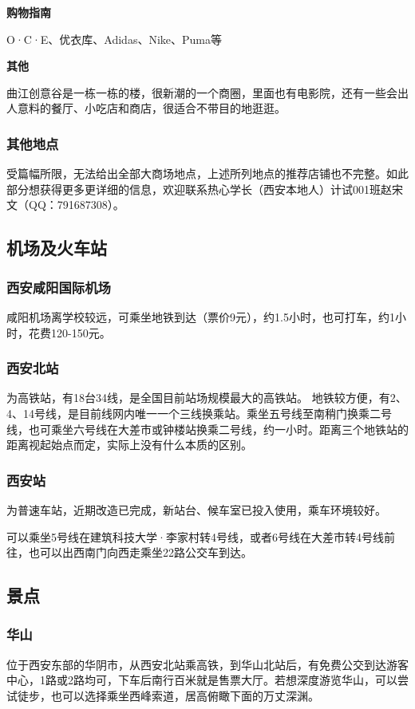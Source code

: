 \documentclass[
decoration,  %
]{qyxf-book}
\begin{document}
\textbf{购物指南}

O·C·E、优衣库、Adidas、Nike、Puma等


\textbf{其他}

曲江创意谷是一栋一栋的楼，很新潮的一个商圈，里面也有电影院，还有一些会出人意料的餐厅、小吃店和商店，很适合不带目的地逛逛。



\subsubsection{其他地点}
受篇幅所限，无法给出全部大商场地点，上述所列地点的推荐店铺也不完整。如此部分想获得更多更详细的信息，欢迎联系热心学长（西安本地人）计试001班赵宋文（QQ：791687308）。

\subsection{机场及火车站}
\subsubsection{西安咸阳国际机场}
咸阳机场离学校较远，可乘坐地铁到达（票价9元），约1.5小时，也可打车，约1小时，花费120-150元。%

\subsubsection{西安北站}
为高铁站，有18台34线，是全国目前站场规模最大的高铁站。
地铁较方便，有2、4、14号线，是目前线网内唯一一个三线换乘站。乘坐五号线至南稍门换乘二号线，也可乘坐六号线在大差市或钟楼站换乘二号线，约一小时。距离三个地铁站的距离视起始点而定，实际上没有什么本质的区别。

\subsubsection{西安站}
为普速车站，近期改造已完成，新站台、候车室已投入使用，乘车环境较好。

可以乘坐5号线在建筑科技大学·李家村转4号线，或者6号线在大差市转4号线前往，也可以出西南门向西走乘坐22路公交车到达。

\subsection{景点}
\subsubsection{华山}
位于西安东部的华阴市，从西安北站乘高铁，到华山北站后，有免费公交到达游客中心，1路或2路均可，下车后南行百米就是售票大厅。若想深度游览华山，可以尝试徒步，也可以选择乘坐西峰索道，居高俯瞰下面的万丈深渊。
\end{document}

